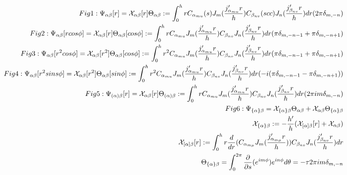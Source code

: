 \documentclass{Note}
\begin{document}
\begin{equation}
\begin{aligned}
Fig1:\Psi_{\alpha\beta}[r]=\mathcal{X}_{\alpha\beta}[r]\Theta_{\alpha\beta}:= \int_0^h r C_{\alpha_{mu}}(s) J_m({j'_{\alpha_{mu}}r\over h})  C_{\beta_{nv}} (scc)J_n({j'_{\beta_{nv}}r\over h})dr (2\pi \delta_{m,-n})\\
Fig2:  \Psi_{\alpha\beta}[rcos\phi]=\mathcal{X}_{\alpha\beta}[r]\Theta_{\alpha\beta}[cos\phi]:=
\int_0^h r C_{\alpha_{mu}} J_m({j'_{\alpha_{mu}}r\over h})  C_{\beta_{nv}} J_n({j'_{\beta_{nv}}r\over h})dr (\pi \delta_{m,-n-1}+\pi \delta_{m,-n+1})\\
 Fig3:  \Psi_{\alpha\beta}[r^2cos\phi]=\mathcal{X}_{\alpha\beta}[r^2]\Theta_{\alpha\beta}[cos\phi]:=
\int_0^h r^2 C_{\alpha_{mu}} J_m({j'_{\alpha_{mu}}r\over h})  C_{\beta_{nv}} J_n({j'_{\beta_{nv}}r\over h})dr  (\pi \delta_{m,-n-1}+\pi \delta_{m,-n+1})\\
 Fig4:  \Psi_{\alpha\beta}[r^2sins\phi]=\mathcal{X}_{\alpha\beta}[r^2]\Theta_{\alpha\beta}[sin\phi]:=
 \int_0^h r^2 C_{\alpha_{mu}} J_m({j'_{\alpha_{mu}}r\over h})  C_{\beta_{nv}} J_n({j'_{\beta_{nv}}r\over h})dr (-i(\pi \delta_{m,-n-1}-\pi \delta_{m,-n+1}))\\
  Fig5:  \Psi_{(\alpha)\beta}[r]=\mathcal{X}_{\alpha\beta}[r]\Theta_{(\alpha)\beta}:=
\int_0^h r C_{\alpha_{mu}} J_m({j'_{\alpha_{mu}}r\over h})  C_{\beta_{nv}} J_n({j'_{\beta_{nv}}r\over h})dr  (2\pi im \delta_{m,-n})\\
 Fig6:  \Psi_{\{\alpha\}\beta}=\mathcal{X}_{\{\alpha\}\beta}\Theta_{\alpha\beta}+\mathcal{X}_{\alpha\beta}\Theta_{\{\alpha\}\beta}\\
 \mathcal{X}_{\{\alpha\}\beta}:=-{h'\over h}(\mathcal{X}_{[\alpha]\beta}[r]+\mathcal{X}_{\alpha\beta})\\
 \mathcal{X}_{[\alpha]\beta}[r]:=\int_0^h r {d\over dr}(C_{\alpha_{m\mu}} J_m({j'_{\alpha_{m\mu}}r\over h}))C_{\beta_{nv}} J_n({j'_{\beta_{nv}}r\over h})dr\\
\Theta_{\{\alpha\}\beta}=\int_0^{2\pi} {\partial \over \partial s}(e^{im\phi}) e^{in\phi} d\theta
=-\tau 2\pi   im \delta_{m,-n}
\end{aligned}
\end{equation}
\end{document}
